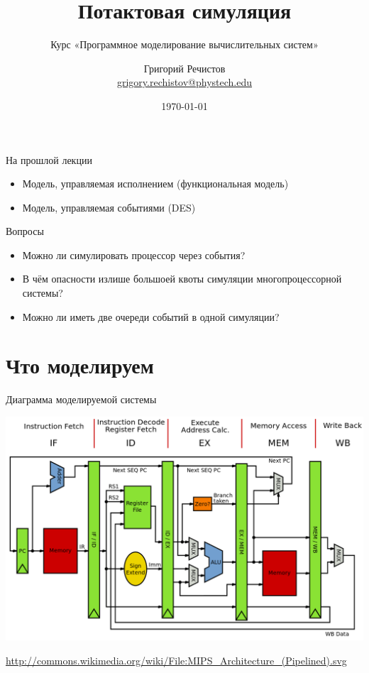 \documentclass{beamer}
\title{Потактовая симуляция}
\subtitle{Курс «Программное моделирование вычислительных систем»}
\author[]{Григорий Речистов \\ \small{\href{mailto:grigory.rechistov@phystech.edu}{grigory.rechistov@phystech.edu}}}
\date{\today}
\begin{document}
\begin{frame}
    \maketitle
\end{frame}

\begin{frame}
    \tableofcontents
\end{frame}

\begin{frame}{На прошлой лекции}
\begin{itemize}
    \item Модель, управляемая исполнением (функциональная модель)
    \item Модель, управляемая событиями (DES)%
\end{itemize}
\end{frame}

\begin{frame}{Вопросы}
\begin{itemize}
\item Можно ли симулировать процессор через события?\pause
\item В чём опасности излише большоей квоты симуляции многопроцессорной системы?\pause
\item Можно ли иметь две очереди событий в одной симуляции?
\end{itemize}

\end{frame}

\section{Что моделируем}

\begin{frame}{Диаграмма моделируемой системы}
\centering

\includegraphics[width=\textwidth]{./mips-arch}

\tiny{\url{http://commons.wikimedia.org/wiki/File:MIPS_Architecture_(Pipelined).svg}}
\end{frame}
\end{document}
